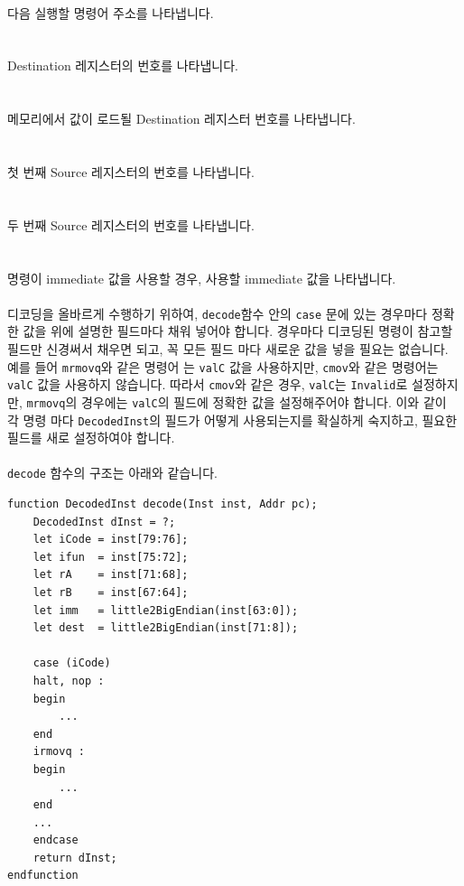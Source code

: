 \documentclass{article}
\begin{document}
\\다음 실행할 명령어 주소를 나타냅니다.
\\\\
\\Destination 레지스터의 번호를 나타냅니다.
\\\\
\\메모리에서 값이 로드될 Destination 레지스터 번호를 나타냅니다.
\\\\
\\첫 번째 Source 레지스터의 번호를 나타냅니다.
\\\\
\\두 번째 Source 레지스터의 번호를 나타냅니다.
\\\\
\\명령이 immediate 값을 사용할 경우, 사용할 immediate 값을 나타냅니다.
\\\\
디코딩을 올바르게 수행하기 위하여, \texttt{decode}함수 안의 \texttt{case} 문에 있는 경우마다 정확한 값을
위에 설명한 필드마다 채워 넣어야 합니다. 경우마다 디코딩된 명령이 참고할 필드만 신경써서 채우면 되고, 꼭 모든 필드 마다 새로운 값을 넣을 필요는 없습니다.
\\예를 들어 \texttt{mrmovq}와 같은 명령어
는 \texttt{valC} 값을 사용하지만, \texttt{cmov}와 같은 명령어는 \texttt{valC} 값을 사용하지 않습니다. 따라서
\texttt{cmov}와 같은 경우, \texttt{valC}는 \texttt{Invalid}로 설정하지만, \texttt{mrmovq}의 경우에는 
\texttt{valC}의 필드에 정확한 값을 설정해주어야 합니다. 이와 같이 각 명령 마다 \texttt{DecodedInst}의 필드가 어떻게 사용되는지를 확실하게 숙지하고, 필요한 필드를 새로 설정하여야 합니다.
\\\\
 \texttt{decode} 함수의 구조는 아래와 같습니다.

\begin{Verbatim}[frame=single]
function DecodedInst decode(Inst inst, Addr pc);
	DecodedInst dInst = ?;
	let iCode = inst[79:76]; 
	let ifun  = inst[75:72];
	let rA    = inst[71:68];
	let rB    = inst[67:64];
	let imm   = little2BigEndian(inst[63:0]);
	let dest  = little2BigEndian(inst[71:8]);

	case (iCode)
	halt, nop :
	begin
		...
	end
	irmovq :
	begin
		...
	end
	...
	endcase
	return dInst;
endfunction
\end{Verbatim}
\end{document}
